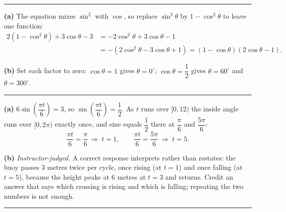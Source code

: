 \documentclass[12pt]{article}
\begin{document}
\vspace{0.15cm}\noindent\rule{\linewidth}{0.2pt}\vspace{0.15cm}


\textbf{(a)} The equation mixes $\sin^2$ with $\cos$, so replace $\sin^2\theta$ by $1 - \cos^2\theta$ to leave one function:
\begin{align*}
  2(1 - \cos^2\theta) + 3\cos\theta - 3 &= -2\cos^2\theta + 3\cos\theta - 1 \\
  &= -(2\cos^2\theta - 3\cos\theta + 1) = (1 - \cos\theta)(2\cos\theta - 1).
\end{align*}

\textbf{(b)} Set each factor to zero: $\cos\theta = 1$ gives $\theta = 0^\circ$; $\cos\theta = \dfrac{1}{2}$ gives $\theta = 60^\circ$ and $\theta = 300^\circ$. 

\vspace{0.15cm}\noindent\rule{\linewidth}{0.2pt}\vspace{0.15cm}


\textbf{(a)} $6\sin\!\left(\dfrac{\pi t}{6}\right) = 3$, so $\sin\!\left(\dfrac{\pi t}{6}\right) = \dfrac{1}{2}$. As $t$ runs over $[0, 12)$ the inside angle runs over $[0, 2\pi)$ exactly once, and sine equals $\dfrac{1}{2}$ there at $\dfrac{\pi}{6}$ and $\dfrac{5\pi}{6}$:
\[ \frac{\pi t}{6} = \frac{\pi}{6} \ \Rightarrow\ t = 1, \qquad \frac{\pi t}{6} = \frac{5\pi}{6} \ \Rightarrow\ t = 5. \]

\textbf{(b)} \emph{Instructor-judged.} A correct response interprets rather than restates: the buoy passes $3$ metres twice per cycle, once rising (at $t = 1$) and once falling (at $t = 5$), because the height peaks at $6$ metres at $t = 3$ and returns. Credit an answer that says which crossing is rising and which is falling; repeating the two numbers is not enough.

\vspace{0.15cm}\noindent\rule{\linewidth}{0.2pt}\vspace{0.15cm}

\end{document}
